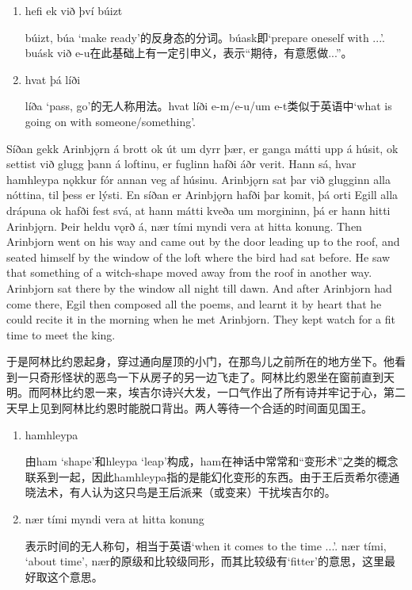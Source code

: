 \begin{grammar*}{}
    \begin{enumerate}[leftmargin=*]
        \item hefi ek við því búizt

              búizt, búa `make ready'的反身态的分词。búask即`prepare oneself with ...'. buásk við e-u在此基础上有一定引申义，表示“期待，有意愿做...”。

        \item hvat þá líði

              líða `pass, go'的无人称用法。hvat líði e-m/e-u/um e-t类似于英语中`what is going on with someone/something'.

    \end{enumerate}
\end{grammar*}
\begin{paracol}{2}
    Síðan gekk Arinbjǫrn á brott ok út um dyrr þær, er ganga mátti upp á húsit, ok settist við glugg þann á loftinu, er fuglinn hafði áðr verit. Hann sá, hvar hamhleypa nǫkkur fór annan veg af húsinu. Arinbjǫrn sat þar við glugginn alla nóttina, til þess er lýsti. En síðan er Arinbjǫrn hafði þar komit, þá orti Egill alla drápuna ok hafði fest svá, at hann mátti kveða um morgininn, þá er hann hitti Arinbjǫrn. Þeir heldu vǫrð á, nær tími myndi vera at hitta konung.
    \switchcolumn
    Then Arinbjorn went on his way and came out by the door leading up to the roof, and seated himself by the window of the loft where the bird had sat before. He saw that something of a witch-shape moved away from the roof in another way. Arinbjorn sat there by the window all night till dawn. And after Arinbjorn had come there, Egil then composed all the poems, and learnt it by heart that he could recite it in the morning when he met Arinbjorn. They kept watch for a fit time to meet the king.
\end{paracol}

\begin{translation*}{}
    于是阿林比约恩起身，穿过通向屋顶的小门，在那鸟儿之前所在的地方坐下。他看到一只奇形怪状的恶鸟一下从房子的另一边飞走了。阿林比约恩坐在窗前直到天明。而阿林比约恩一来，埃吉尔诗兴大发，一口气作出了所有诗并牢记于心，第二天早上见到阿林比约恩时能脱口背出。两人等待一个合适的时间面见国王。
\end{translation*}
\begin{grammar*}{}
    \begin{enumerate}[leftmargin=*]
        \item hamhleypa

              由ham `shape'和hleypa `leap'构成，ham在神话中常常和“变形术”之类的概念联系到一起，因此hamhleypa指的是能幻化变形的东西。由于王后贡希尔德通晓法术，有人认为这只鸟是王后派来（或变来）干扰埃吉尔的。

        \item nær tími myndi vera at hitta konung

              表示时间的无人称句，相当于英语`when it comes to the time ...'. nær tími, `about time', nær的原级和比较级同形，而其比较级有`fitter'的意思，这里最好取这个意思。
    \end{enumerate}
\end{grammar*}


